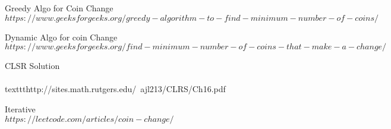 \documentclass[5pt]{article}
\begin{document}
\begin{thebibliography}{9}
Greedy Algo for Coin Change
\\\texttt{$https://www.geeksforgeeks.org/greedy-algorithm-to-find-minimum-number-of-coins/$}
 
Dynamic Algo for coin Change
\\\texttt{$https://www.geeksforgeeks.org/find-minimum-number-of-coins-that-make-a-change/$}

CLSR Solution
\\\\texttt{http://sites.math.rutgers.edu/~ajl213/CLRS/Ch16.pdf}

Iterative
\\\texttt{$https://leetcode.com/articles/coin-change/$}

\end{thebibliography}
\end{document}
